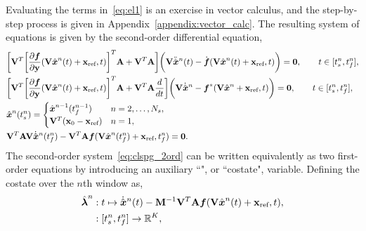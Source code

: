 Evaluating the terms in~\eqref{eq:el1} is an exercise in
vector calculus, and the step-by-step process is given in
Appendix~\ref{appendix:vector_calc}. The resulting system of equations is
given by the second-order differential equation,
\begin{equation}\label{eq:clspg_2ord}
\begin{split} 
&\bigg[\basisspace^T \bigg[\frac{\partial
\velocity}{\partial \stateyDiscreteArgnt{}} (\basisspace \genstateArg{n}{t} +
\stateIntercept,t)\bigg]^T \stweightingMatArgt{n}{t} + \basisspace^T
\stweightingMatArgt{n}{t} \bigg] \bigg(  \basisspace
\genstateDDotArg{n}{t}    -  \velocityDot(\basisspace \genstateArg{n}{t} + \stateIntercept,t) \bigg) = \bz, \qquad t \in  [\timeStartArg{n},\timeEndArg{n}],
\\
&\bigg[\basisspace^T \bigg[\frac{\partial
\velocity}{\partial \stateyDiscreteArgnt{}} (\basisspace \genstateArg{n}{t} +
\stateIntercept,t)\bigg]^T \stweightingMatArgt{n}{t} + \basisspace^T
\stweightingMatArgt{n}{t} \frac{d}{dt} \bigg] \bigg(  \basisspace
\genstateDotArgnt{n}    -  \velocity^*(\basisspace \genstateArgnt{n} + \stateIntercept,t) \bigg) = \bz, \qquad t \in  [\timeStartArg{n},\timeEndArg{n}],
\\
&\genstate^n( \timeStartArg{n})  = \begin{cases}
\genstate^{n-1}(\timeEndArg{n-1}) & n=2,\ldots,\nslabs, \\
\basisspace^T(\stateFOMIC - \stateIntercept) & n=1, \end{cases}\\ 
& 
\basisspace^T \stweightingMatArgt{n}{\timeEndArg{n}} \basisspace \genstateDotArg{n}{\timeEndArg{n}}  -
\basisspace^T \stweightingMatArgt{n}{\timeEndArg{n}}
\velocity(\basisspace \genstateArg{n}{\timeEndArg{n}} + \stateIntercept,\timeEndArg{n}) = \bz.  
\end{split}
\end{equation}
The second-order system~\eqref{eq:clspg_2ord} can be written equivalently as two first-order
equations by introducing an auxiliary ``\adjointStr", or ``costate", variable. %
Defining the costate over the $n$th window as, 
\begin{equation}\label{eq:costate_def}
\begin{split}
\adjointArgnt{n} &: t \mapsto \genstateDotArg{n}{t}  -  \mass^{-1} \basisspace^T \stweightingMatArgt{n}{t}\velocity(\veloargsromn) ,\\
&: [\timeStartArg{n},\timeEndArg{n}] \rightarrow \RR{K} ,
\end{split}
\end{equation}
